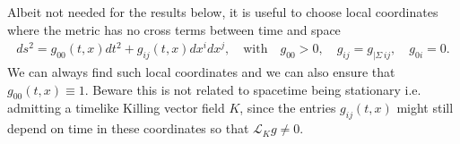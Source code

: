 \documentclass[../QFT_main.tex]{subfiles}
\begin{document}
\begin{mytheorem}[Adapted coordinates without space-time cross terms $g_{0i}=0$ and $g_{00}\equiv 1$]
Albeit not needed for the results below, it is useful to choose local coordinates where the metric has no cross terms between time and space
{\small\begin{align}\label{eq:adapted_nocross_coordinates}
    ds^2 = g_{00}(t,x) dt^2 + g_{ij}(t,x) dx^i dx^j, \quad \text{with}\quad g_{00}>0, \quad g_{ij} = g_{|\Sigma\, ij},\quad g_{0i}=0.
\end{align}}
We can always find such local coordinates and we can also ensure that $g_{00}(t,x)\equiv1$.
Beware this is not related to spacetime being stationary i.e. admitting a timelike Killing vector field $K$, since the entries $g_{ij}(t,x)$ might still depend on time in these coordinates so that $\mathcal{L}_K g\neq0$.


\end{mytheorem}
\end{document}

